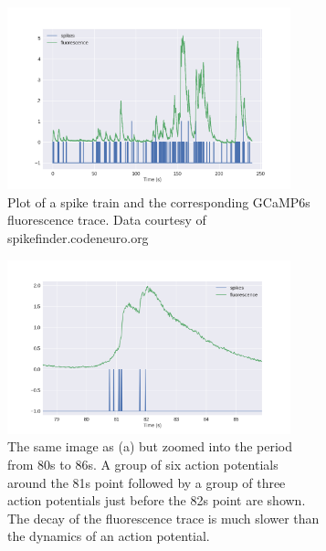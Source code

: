 \documentclass[a4paper,12pt]{article}
\theoremstyle{definition}
\begin{document}
\begin{figure}[p]
  \begin{subfigure}{\textwidth}
    \centering
    \includegraphics[width=0.9\textwidth]{figures/spike_finder_example_8.png}
    \caption{Plot of a spike train and the corresponding GCaMP6s fluorescence trace. Data courtesy of spikefinder.codeneuro.org}
  \end{subfigure}
  \begin{subfigure}{\textwidth}
    \centering
    \includegraphics[width=0.9\textwidth]{figures/spike_finder_example_8_zoomed.png}
    \caption{The same image as (a) but zoomed into the period from 80s to 86s. A group of six action potentials around the 81s point followed by a group of three action potentials just before the 82s point are shown. The decay of the fluorescence trace is much slower than the dynamics of an action potential.}
  \end{subfigure}
  \caption{}
  \label{fig:spike_finder_example}
\end{figure}
\end{document}
